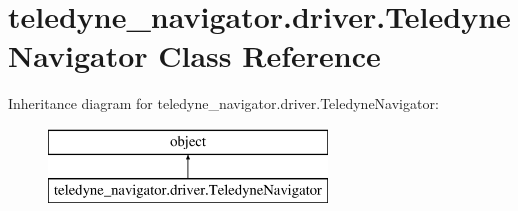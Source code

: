 \hypertarget{classteledyne__navigator_1_1driver_1_1TeledyneNavigator}{}\section{teledyne\+\_\+navigator.\+driver.\+Teledyne\+Navigator Class Reference}
\label{classteledyne__navigator_1_1driver_1_1TeledyneNavigator}
Inheritance diagram for teledyne\+\_\+navigator.\+driver.\+Teledyne\+Navigator\+:\begin{figure}[H]
\begin{center}
\leavevmode
\includegraphics[height=2.000000cm]{classteledyne__navigator_1_1driver_1_1TeledyneNavigator}
\end{center}
\end{figure}
